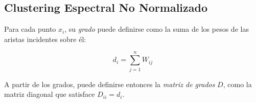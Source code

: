 \subsection{Clustering Espectral No Normalizado}\label{subsec:clusteringEspectralNoNormalizado}

Para cada punto $x_i$, su \textit{grado} puede definirse como la suma de los pesos de las aristas incidentes sobre él:

\begin{equation*}
    d_i = \sum_{j=1}^{n}{W_{ij}}
\end{equation*}

A partir de los grados, puede definirse entonces la \textit{matriz de grados} $D$, como la matriz diagonal que satisface $D_{ii}=d_i$.
